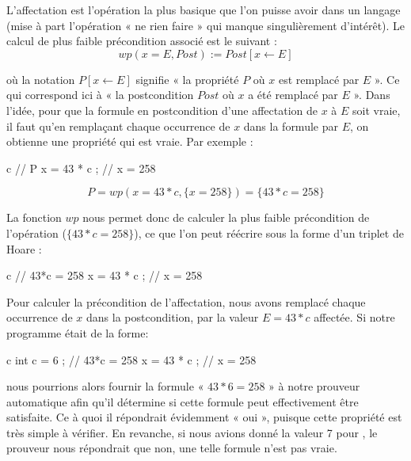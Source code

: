 

L'affectation est l'opération la plus basique que l'on puisse avoir dans un 
langage (mise à part l'opération « ne rien faire » qui manque singulièrement 
d'intérêt). Le calcul de plus faible précondition associé est le suivant :
$$wp(x = E , Post) := Post[x \leftarrow E]$$


où la notation $P[x \leftarrow E]$ signifie « la propriété $P$ où $x$ est remplacé
par $E$ ». Ce qui correspond ici à « la postcondition $Post$ où $x$ a été
remplacé par $E$ ». Dans l'idée, pour que la formule en postcondition d'une 
affectation de $x$ à $E$ soit vraie, il faut qu'en remplaçant chaque occurrence de
$x$ dans la formule par $E$, on obtienne une propriété qui est vraie. Par exemple :



\begin{CodeBlock}{c}
// { P }
x = 43 * c ;
// { x = 258 }
\end{CodeBlock}

$$P = wp(x = 43*c , \{x = 258\}) = \{43*c = 258\}$$


La fonction $wp$ nous permet donc de calculer la plus faible précondition de
l'opération ($\{43*c = 258\}$), ce que l'on peut réécrire sous la forme d'un
triplet de Hoare :



\begin{CodeBlock}{c}
// { 43*c = 258 }
x = 43 * c ;
// { x = 258 }
\end{CodeBlock}



Pour calculer la précondition de l'affectation, nous avons remplacé chaque 
occurrence de $x$ dans la postcondition, par la valeur $E = 43*c$ affectée.
Si notre programme était de la forme:



\begin{CodeBlock}{c}
int c = 6 ;
// { 43*c = 258 }
x = 43 * c ;
// { x = 258 }
\end{CodeBlock}



nous pourrions alors fournir la formule « $43*6 = 258$ » à notre prouveur automatique
afin qu'il détermine si cette formule peut effectivement être satisfaite. Ce à quoi
il répondrait évidemment « oui », puisque cette propriété est très simple à vérifier.
En revanche, si nous avions donné la valeur 7 pour , le prouveur nous répondrait
que non, une telle formule n'est pas vraie.



